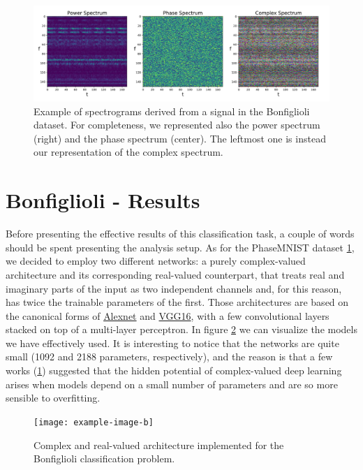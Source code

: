 \documentclass[../main.tex]{subfiles}
\begin{document}
\begin{figure}[ht]
	\centering
	\includegraphics[width=\textwidth]{pictures/example_bonfiglioli_spectrum}
	\caption{Example of spectrograms derived from a signal in the Bonfiglioli dataset. For completeness, we represented also the power spectrum (right) and the phase spectrum (center). The leftmost one is instead our representation of the complex spectrum.}
	\label{fig:example_bonfiglioli_spectrum}
\end{figure}


\section{Bonfiglioli - Results}

Before presenting the effective results of this classification task, a couple of words should be spent presenting the analysis setup. As for the PhaseMNIST dataset \ref{}, we decided to employ two different networks: a purely complex-valued architecture and its corresponding real-valued counterpart, that treats real and imaginary parts of the input as two independent channels and, for this reason, has twice the trainable parameters of the first. Those architectures are based on the canonical forms of \href{https://en.wikipedia.org/wiki/AlexNet}{Alexnet} and \href{https://medium.com/@mygreatlearning/what-is-vgg16-introduction-to-vgg16-f2d63849f615}{VGG16}, with a few convolutional layers stacked on top of a multi-layer perceptron. In figure \ref{fig:bonfiglioli_architectures} we can visualize the models we have effectively used. It is interesting to notice that the networks are quite small (1092 and 2188 parameters, respectively), and the reason is that a few works (\ref{}) suggested that the hidden potential of complex-valued deep learning arises when models depend on a small number of parameters and are so more sensible to overfitting.
\begin{figure}[!ht]
	\centering
	\texttt{[image: example-image-b]}
	\caption{Complex and real-valued architecture implemented for the Bonfiglioli classification problem.}
	\label{fig:bonfiglioli_architectures}
\end{figure}
\end{document}
